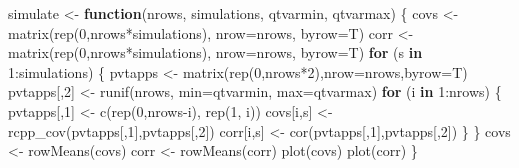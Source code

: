 \documentclass[
]{article}
\newenvironment{Shaded}{\begin{snugshade}}{\end{snugshade}}
\newcommand{\AttributeTok}[1]{\textcolor[rgb]{0.77,0.63,0.00}{#1}}
\newcommand{\ControlFlowTok}[1]{\textcolor[rgb]{0.13,0.29,0.53}{\textbf{#1}}}
\newcommand{\DecValTok}[1]{\textcolor[rgb]{0.00,0.00,0.81}{#1}}
\newcommand{\FunctionTok}[1]{\textcolor[rgb]{0.00,0.00,0.00}{#1}}
\newcommand{\NormalTok}[1]{#1}
\newcommand{\OtherTok}[1]{\textcolor[rgb]{0.56,0.35,0.01}{#1}}
\newcommand{\SpecialCharTok}[1]{\textcolor[rgb]{0.00,0.00,0.00}{#1}}
\begin{document}
\begin{Shaded}
\begin{Highlighting}[]
\NormalTok{simulate }\OtherTok{\textless{}{-}} \ControlFlowTok{function}\NormalTok{(nrows, simulations, qtvarmin, qtvarmax) \{}
\NormalTok{    covs }\OtherTok{\textless{}{-}} \FunctionTok{matrix}\NormalTok{(}\FunctionTok{rep}\NormalTok{(}\DecValTok{0}\NormalTok{,nrows}\SpecialCharTok{*}\NormalTok{simulations), }\AttributeTok{nrow=}\NormalTok{nrows, }\AttributeTok{byrow=}\NormalTok{T)}
\NormalTok{    corr }\OtherTok{\textless{}{-}} \FunctionTok{matrix}\NormalTok{(}\FunctionTok{rep}\NormalTok{(}\DecValTok{0}\NormalTok{,nrows}\SpecialCharTok{*}\NormalTok{simulations), }\AttributeTok{nrow=}\NormalTok{nrows, }\AttributeTok{byrow=}\NormalTok{T)}
    \ControlFlowTok{for}\NormalTok{ (s }\ControlFlowTok{in} \DecValTok{1}\SpecialCharTok{:}\NormalTok{simulations) \{}
\NormalTok{        pvtapps }\OtherTok{\textless{}{-}} \FunctionTok{matrix}\NormalTok{(}\FunctionTok{rep}\NormalTok{(}\DecValTok{0}\NormalTok{,nrows}\SpecialCharTok{*}\DecValTok{2}\NormalTok{),}\AttributeTok{nrow=}\NormalTok{nrows,}\AttributeTok{byrow=}\NormalTok{T)}
\NormalTok{        pvtapps[,}\DecValTok{2}\NormalTok{] }\OtherTok{\textless{}{-}} \FunctionTok{runif}\NormalTok{(nrows, }\AttributeTok{min=}\NormalTok{qtvarmin, }\AttributeTok{max=}\NormalTok{qtvarmax)}
        \ControlFlowTok{for}\NormalTok{ (i }\ControlFlowTok{in} \DecValTok{1}\SpecialCharTok{:}\NormalTok{nrows) \{}
\NormalTok{            pvtapps[,}\DecValTok{1}\NormalTok{] }\OtherTok{\textless{}{-}} \FunctionTok{c}\NormalTok{(}\FunctionTok{rep}\NormalTok{(}\DecValTok{0}\NormalTok{,nrows}\SpecialCharTok{{-}}\NormalTok{i), }\FunctionTok{rep}\NormalTok{(}\DecValTok{1}\NormalTok{, i))}
\NormalTok{            covs[i,s] }\OtherTok{\textless{}{-}} \FunctionTok{rcpp\_cov}\NormalTok{(pvtapps[,}\DecValTok{1}\NormalTok{],pvtapps[,}\DecValTok{2}\NormalTok{])}
\NormalTok{            corr[i,s] }\OtherTok{\textless{}{-}} \FunctionTok{cor}\NormalTok{(pvtapps[,}\DecValTok{1}\NormalTok{],pvtapps[,}\DecValTok{2}\NormalTok{])}
\NormalTok{        \}}
\NormalTok{    \}}
\NormalTok{    covs }\OtherTok{\textless{}{-}} \FunctionTok{rowMeans}\NormalTok{(covs)}
\NormalTok{    corr }\OtherTok{\textless{}{-}} \FunctionTok{rowMeans}\NormalTok{(corr)}
    \FunctionTok{plot}\NormalTok{(covs)}
    \FunctionTok{plot}\NormalTok{(corr)}
\NormalTok{\}}
\end{Highlighting}
\end{Shaded}
\end{document}
